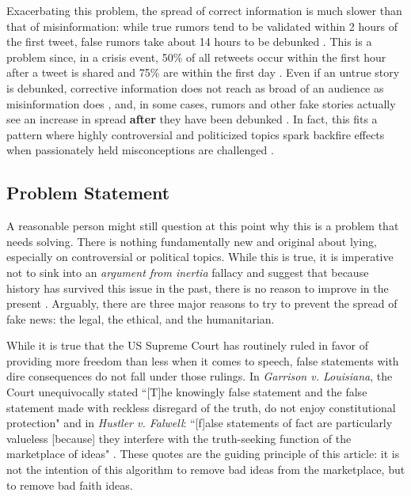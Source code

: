 \documentclass[preprint,review,12pt]{elsarticle}
\begin{document}
Exacerbating this problem, the spread of correct information is much slower than that of misinformation: while true rumors tend to be validated within 2 hours of the first tweet, false rumors take about 14 hours to be debunked \cite{zubiaga2016analysing,shao2016hoaxy}. This is a problem since, in a crisis event, 50\% of all retweets occur within the first hour after a tweet is shared and 75\% are within the first day \cite{kwak2010twitter}. Even if an untrue story is debunked, corrective information does not reach as broad of an audience as misinformation does \cite{maddock2015characterizing, vosoughi2018spread}, and, in some cases, rumors and other fake stories actually see an increase in spread \textbf{after} they have been debunked \cite{starbird2014rumors}. In fact, this fits a pattern where highly controversial and politicized topics spark backfire effects when passionately held misconceptions are challenged \cite{gollust2009polarizing,nyhan2010corrections,nyhan2013hazards,redlawsk2010affective,schaffner2016misinformation,hart2012boomerang}.

\subsection{Problem Statement}
\label{Problem Statement}
A reasonable person might still question at this point why this is a problem that needs solving. There is nothing fundamentally new and original about lying, especially on controversial or political topics. While this is true, it is imperative not to sink into an \textit{argument from inertia} fallacy and suggest that because history has survived this issue in the past, there is no reason to improve in the present \cite{bennett2012logically}. Arguably, there are three major reasons to try to prevent the spread of fake news: the legal, the ethical, and the humanitarian.

While it is true that the US Supreme Court has routinely ruled in favor of providing more freedom than less when it comes to speech, false statements with dire consequences do not fall under those rulings. 
In \textit{Garrison v. Louisiana}, the Court unequivocally stated ``[T]he knowingly false statement and the false statement made with reckless disregard of the truth, do not enjoy constitutional protection" \cite{scotus1964garrison} and in \textit{Hustler v. Falwell}: ``[f]alse statements of fact are particularly valueless [because] they interfere with the truth-seeking function of the marketplace of ideas" \cite{scotus1987hustler}. These quotes are the guiding principle of this article: it is not the intention of this algorithm to remove bad ideas from the marketplace, but to remove bad faith ideas.
\end{document}
